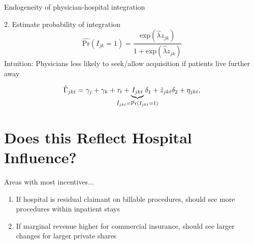 \documentclass[t,aspectratio=169]{beamer}
\begin{document}
\begin{frame}{Endogeneity of physician-hospital integration}
{\begin{block}{2. Estimate probability of integration}
            \begin{equation*}
                \hat{\text{Pr}}\left(I_{jk}=1\right) = \frac{\text{exp}\left(\hat{\lambda} z_{jk}\right)}{1+\text{exp}\left(\hat{\lambda} z_{jk}\right)}
            \end{equation*}
            \noindent Intuition: Physicians less likely to seek/allow acquisition if patients live further away
        \end{block}
        \begin{equation*}
            \hat{\Gamma}_{jkt} = \gamma_{j} + \gamma_{k} + \tau_{t} + \underbrace{I_{jkt}}_{\mathclap{\hat{I}_{jkt}=\hat{\text{Pr}}(I_{jkt}=1)}} \delta_{1}  + \tilde{z}_{jkt}\delta_{2} + \eta_{jkt},
        \end{equation*}
    }
\end{frame}


\section{Does this Reflect Hospital Influence?}

\begin{frame}{Areas with most incentives...}
    \begin{enumerate}
        \item If hospital is residual claimant on billable procedures, should see more procedures within inpatient stays
        \item If marginal revenue higher for commercial insurance, should see larger changes for larger private shares
    \end{enumerate}
\end{frame}
\end{document}

